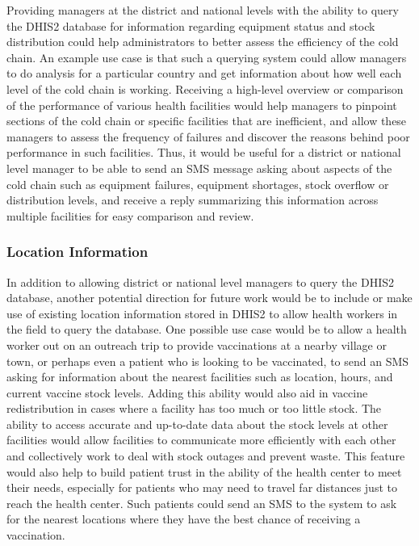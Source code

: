\documentclass{acm_proc_article-sp}
\begin{document}
Providing managers at the district and national levels with the ability to query the DHIS2 database for information regarding equipment status and stock distribution could help administrators to better assess the efficiency of the cold chain. An example use case is that such a querying system could allow managers to do analysis for a particular country and get information about how well each level of the cold chain is working. Receiving a high-level overview or comparison of the performance of various health facilities would help managers to pinpoint sections of the cold chain or specific facilities that are inefficient, and allow these managers to assess the frequency of failures and discover the reasons behind poor performance in such facilities. Thus, it would be useful for a district or national level manager to be able to send an SMS message asking about aspects of the cold chain such as equipment failures, equipment shortages, stock overflow or distribution levels, and receive a reply summarizing this information across multiple facilities for easy comparison and review.

\subsubsection{Location Information}

In addition to allowing district or national level managers to query the DHIS2 database, another potential direction for future work would be to include or make use of existing location information stored in DHIS2 to allow health workers in the field to query the database. One possible use case would be to allow a health worker out on an outreach trip to provide vaccinations at a nearby village or town, or perhaps even a patient who is looking to be vaccinated, to send an SMS asking for information about the nearest facilities such as location, hours, and current vaccine stock levels. Adding this ability would also aid in vaccine redistribution in cases where a facility has too much or too little stock. The ability to access accurate and up-to-date data about the stock levels at other facilities would allow facilities to communicate more efficiently with each other and collectively work to deal with stock outages and prevent waste. This feature would also help to build patient trust in the ability of the health center to meet their needs, especially for patients who may need to travel far distances just to reach the health center. Such patients could send an SMS to the system to ask for the nearest locations where they have the best chance of receiving a vaccination.
\end{document}
